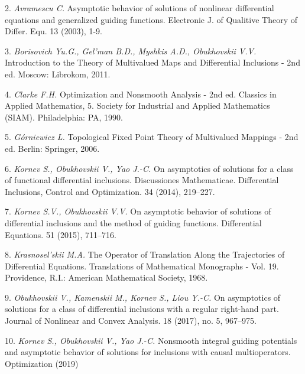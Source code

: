 2. {\it Avramescu C.} Asymptotic behavior of solutions of nonli\-near differential equations and generalized guiding functions. Elec\-tronic J. of Qualitive Theory of Differ. Equ. 13 (2003), 1-9.

3. {\it Borisovich Yu.G., Gel'man B.D., Myshkis A.D., Obukho\-vskii V.V.} Introduction to the Theory of Multivalued Maps and Dif\-fe\-ren\-tial Inclusions - 2nd ed. Moscow: Librokom, 2011.

4. {\it Clarke F.H.} Optimization and Nonsmooth Analysis - 2nd ed. Classics in Applied Mathematics, 5. Society for Industrial and Applied Mathematics (SIAM). Philadelphia: PA, 1990.

5. {\it G\'orniewicz L.} Topological Fixed Point Theory of Multi\-valued Mappings - 2nd ed. Berlin: Springer, 2006.

6. {\it Kornev S., Obukhovskii V., Yao J.-C.} On asymptotics of solutions for a class of functional differential inclusions. Discus\-sio\-nes Mathematicae. Differential Inclusions, Control and Opti\-mi\-zation. 34 (2014), 219--227.

7. {\it Kornev S.V., Obukhovskii V.V.} On asymptotic behavior of solutions of differential inclusions and the method of guiding functions. Differential Equations. 51 (2015), 711--716.

8. {\it Krasnosel'skii M.A.} The Operator of Translation Along the Trajectories of Differential Equations. Translations of Mathe\-ma\-tical Monographs - Vol. 19. Providence, R.I.: American Ma\-the\-matical Society, 1968.

9. {\it Obukhovskii V., Kamenskii M., Kornev S., Liou Y.-C.} On asymptotics of solutions for a class of differential inclusions with a regular right-hand part. Journal of Nonlinear and Convex Analysis. 18 (2017), no. 5, 967--975.

10. {\it Kornev S., Obukhovskii V., Yao J.-C.} Nonsmooth integral guiding potentials and asymptotic behavior of solutions for inclusions with causal multioperators. Optimization (2019)

